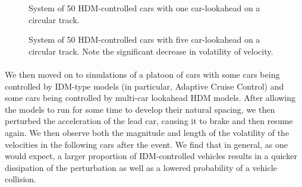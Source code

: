 \documentclass[12pt]{article}
\begin{document}
\begin{figure}[H]
  \centering
  \caption{System of 50 HDM-controlled cars with one car-lookahead on a circular track.}
\end{figure}

\begin{figure}[H]
  \centering
  \caption{System of 50 HDM-controlled cars with five car-lookahead on a circular track. Note the significant decrease in volatility of velocity.}
\end{figure}

\paragraph{}We then moved on to simulations of a platoon of cars with some cars being controlled by IDM-type models (in particular, Adaptive Cruise Control) and some cars being controlled by multi-car lookahead HDM models. After allowing the models to run for some time to develop their natural spacing, we then perturbed the acceleration of the lead car, causing it to brake and then resume again. We then observe both the magnitude and length of the volatility of the velocities in the following cars after the event. We find that in general, as one would expect, a larger proportion of IDM-controlled vehicles results in a quicker dissipation of the perturbation as well as a lowered probability of a vehicle collision.\\
\end{document}
